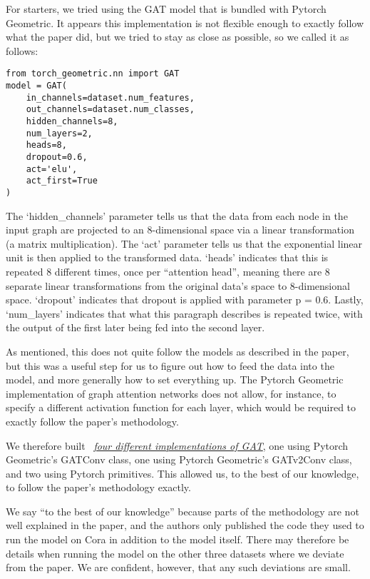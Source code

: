 For starters, we tried using the GAT model that is bundled with Pytorch
Geometric. It appears this implementation is not flexible enough to exactly
follow what the paper did, but we tried to stay as close as possible, so we
called it as follows:

\begin{verbatim}
from torch_geometric.nn import GAT
model = GAT(
    in_channels=dataset.num_features,
    out_channels=dataset.num_classes,
    hidden_channels=8,
    num_layers=2,
    heads=8,
    dropout=0.6,
    act='elu',
    act_first=True
)
\end{verbatim}

The `hidden\_channels' parameter tells us that the data from each node in the
input graph are projected to an 8-dimensional space via a linear transformation
(a matrix multiplication). The `act' parameter tells us that the exponential
linear unit is then applied to the transformed data.  `heads' indicates that
this is repeated 8 different times, once per ``attention head'', meaning there
are 8 separate linear transformations from the original data's space to
8-dimensional space. `dropout' indicates that dropout is applied with
parameter p = 0.6. Lastly, `num\_layers' indicates that what this paragraph
describes is repeated twice, with the output of the first later being fed into
the second layer.

As mentioned, this does not quite follow the models as described in the paper,
but this was a useful step for us to figure out how to feed the data into the
model, and more generally how to set everything up.
The Pytorch Geometric implementation of graph attention networks does not allow, for instance, to
specify a different activation function for each layer, which would be required
to exactly follow the paper's methodology.

We therefore built ~\href{https://github.com/kushagrasoni/CS598_DLH_GAT_Implementation/blob/master/code/GAT_Implementation_Notebook.ipynb}{\textit{four different
implementations of GAT}}, one using Pytorch Geometric's GATConv class, one using Pytorch Geometric's GATv2Conv class, and
two using Pytorch primitives.
This allowed us, to the best of our knowledge, to follow the paper's methodology exactly.

We say ``to the best of our knowledge'' because parts of the methodology are not well explained in the paper, and the
authors only published the code they used to run the model on Cora in addition
to the model itself.
There may therefore be details when running the model on the other three datasets where we deviate from the paper.
We are confident, however, that any such deviations are small.
